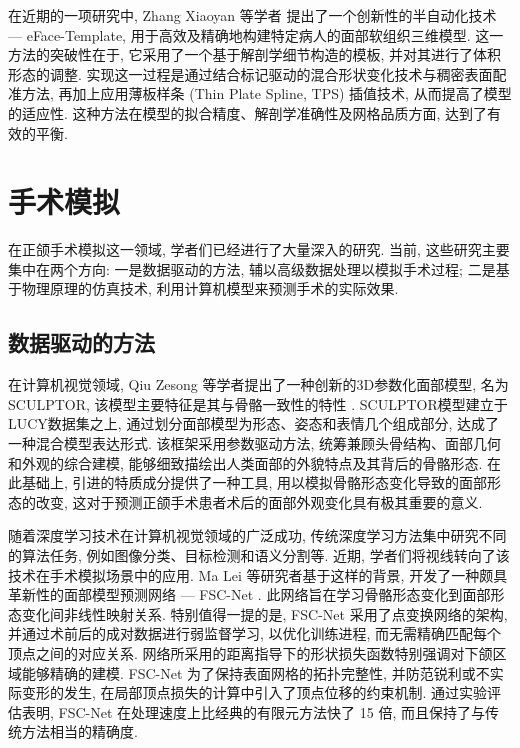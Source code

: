 在近期的一项研究中, Zhang Xiaoyan 等学者 \cite{zhangEFacetemplateMethodEfficiently2016} 提出了一个创新性的半自动化技术 --- eFace-Template, 用于高效及精确地构建特定病人的面部软组织三维模型.
这一方法的突破性在于, 它采用了一个基于解剖学细节构造的模板, 并对其进行了体积形态的调整.
实现这一过程是通过结合标记驱动的混合形状变化技术与稠密表面配准方法, 再加上应用薄板样条 (Thin Plate Spline, TPS) 插值技术, 从而提高了模型的适应性.
这种方法在模型的拟合精度、解剖学准确性及网格品质方面, 达到了有效的平衡.

\section{手术模拟}

在正颌手术模拟这一领域, 学者们已经进行了大量深入的研究.
当前, 这些研究主要集中在两个方向: 一是数据驱动的方法, 辅以高级数据处理以模拟手术过程; 二是基于物理原理的仿真技术, 利用计算机模型来预测手术的实际效果.

\subsection{数据驱动的方法}

在计算机视觉领域, Qiu Zesong 等学者提出了一种创新的3D参数化面部模型, 名为 SCULPTOR, 该模型主要特征是其与骨骼一致性的特性 \cite{qiuSCULPTORSkeletonconsistentFace2022a}.
SCULPTOR模型建立于LUCY数据集之上, 通过划分面部模型为形态、姿态和表情几个组成部分, 达成了一种混合模型表达形式.
该框架采用参数驱动方法, 统筹兼顾头骨结构、面部几何和外观的综合建模, 能够细致描绘出人类面部的外貌特点及其背后的骨骼形态.
在此基础上, 引进的特质成分提供了一种工具, 用以模拟骨骼形态变化导致的面部形态的改变, 这对于预测正颌手术患者术后的面部外观变化具有极其重要的意义.

随着深度学习技术在计算机视觉领域的广泛成功, 传统深度学习方法集中研究不同的算法任务, 例如图像分类、目标检测和语义分割等.
近期, 学者们将视线转向了该技术在手术模拟场景中的应用.
Ma Lei 等研究者基于这样的背景, 开发了一种颇具革新性的面部模型预测网络 --- FSC-Net \cite{maSimulationPostoperativeFacial2023}.
此网络旨在学习骨骼形态变化到面部形态变化间非线性映射关系.
特别值得一提的是, FSC-Net 采用了点变换网络的架构, 并通过术前后的成对数据进行弱监督学习, 以优化训练进程, 而无需精确匹配每个顶点之间的对应关系.
网络所采用的距离指导下的形状损失函数特别强调对下颌区域能够精确的建模.
FSC-Net 为了保持表面网格的拓扑完整性, 并防范锐利或不实际变形的发生, 在局部顶点损失的计算中引入了顶点位移的约束机制.
通过实验评估表明, FSC-Net 在处理速度上比经典的有限元方法快了 15 倍, 而且保持了与传统方法相当的精确度.

